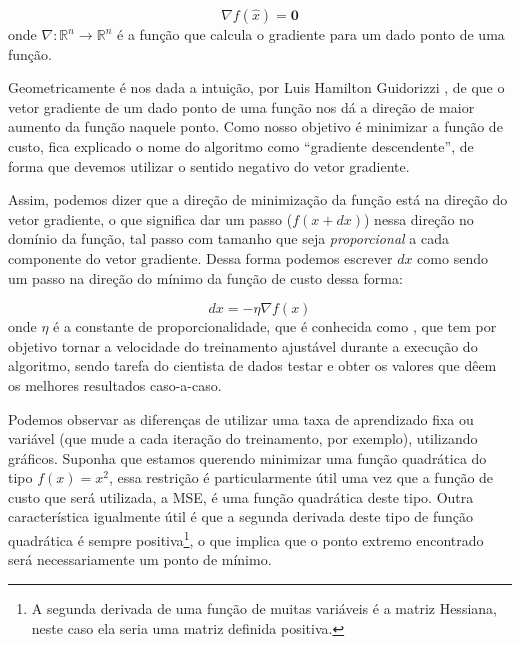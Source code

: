 \begin{equation}\label{grad_1}
\nabla f(\hat{x}) = \mathbf{0}
\end{equation}
onde $\nabla{:}\mathbb{R}^n \rightarrow \mathbb{R}^n$ é a função que calcula o gradiente para um dado ponto de uma função.

Geometricamente é nos dada a intuição, por Luis Hamilton Guidorizzi \citep{guidorizzi2}, de que o vetor gradiente de um dado ponto de uma função nos dá a direção de maior aumento da função naquele ponto. Como nosso objetivo é minimizar a função de custo, fica explicado o nome do algoritmo como ``gradiente descendente'', de forma que devemos utilizar o sentido negativo do vetor gradiente.

Assim, podemos dizer que a direção de minimização da função está na direção do vetor gradiente, o que significa dar um passo ($f(x + dx)$) nessa direção no domínio da função, tal passo com tamanho que seja \emph{proporcional} a cada componente do vetor gradiente. Dessa forma podemos escrever $dx$ como sendo um passo na direção do mínimo da função de custo dessa forma:

\begin{equation}\label{grad_2}
dx = - \eta \nabla f(x)
\end{equation}
onde $\eta$ é a constante de proporcionalidade, que é conhecida como , que tem por objetivo tornar a velocidade do treinamento ajustável durante a execução do algoritmo, sendo tarefa do cientista de dados testar e obter os valores que dêem os melhores resultados caso-a-caso. 

Podemos observar as diferenças de utilizar uma taxa de aprendizado fixa ou variável (que mude a cada iteração do treinamento, por exemplo), utilizando gráficos. Suponha que estamos querendo minimizar uma função quadrática do tipo $f(x) = x^2$, essa restrição é particularmente útil uma vez que a função de custo que será utilizada, a MSE, é uma função quadrática deste tipo. Outra característica igualmente útil é que a segunda derivada deste tipo de função quadrática é sempre positiva\footnote{A segunda derivada de uma função de muitas variáveis é a matriz Hessiana, neste caso ela seria uma matriz definida positiva.}, o que implica que o ponto extremo encontrado será necessariamente um ponto de mínimo.

